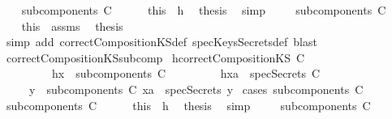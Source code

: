\begin{isabellebody}
\ \ \isamarkupfalse%
\ {\isachardoublequoteopen}subcomponents\ C\ {\isacharequal}\ {\isacharbraceleft}{\isacharbraceright}{\isachardoublequoteclose}\isanewline
\ \ \isamarkupfalse%
\ this\ \ h{}\ \isamarkupfalse%
\ {\isacharquery}thesis\ \isamarkupfalse%
\ simp\ \isanewline
{}\isamarkupfalse%
\isanewline
\ \ \isamarkupfalse%
\ {\isachardoublequoteopen}subcomponents\ C\ {\isasymnoteq}\ {\isacharbraceleft}{\isacharbraceright}{\isachardoublequoteclose}\isanewline
\ \ \isamarkupfalse%
\ this\ \ assms\ \isamarkupfalse%
\ {\isacharquery}thesis\ \isanewline
\ \ \isamarkupfalse%
\ {\isacharparenleft}simp\ add{\isacharcolon}\ correctCompositionKS{\isacharunderscore}def\ specKeysSecrets{\isacharunderscore}def{\isacharcomma}\ blast{\isacharparenright}\ \isanewline
{}\isamarkupfalse%
%
\endisatagproof
{\isafoldproof}%
%
\isadelimproof
\isanewline
%
\endisadelimproof
\isanewline
{}\isamarkupfalse%
\ correctCompositionKS{\isacharunderscore}subcomp{}{\isacharcolon}\isanewline
{}\ h{}{\isacharcolon}{\isachardoublequoteopen}correctCompositionKS\ C{\isachardoublequoteclose}\isanewline
\ \ \ \ \ \ \ \ \ h{}{\isacharcolon}{\isachardoublequoteopen}x\ {\isasymin}\ subcomponents\ C{\isachardoublequoteclose}\isanewline
\ \ \ \ \ \ \ \ \ h{}{\isacharcolon}{\isachardoublequoteopen}xa\ {\isasymin}\ specSecrets\ C{\isachardoublequoteclose}\isanewline
{}\ \ \ \ {\isachardoublequoteopen}{\isasymexists}\ y\ {\isasymin}\ subcomponents\ C{\isachardot}\ xa\ {\isasymin}\ specSecrets\ y{\isachardoublequoteclose}\isanewline
%
\isadelimproof
%
\endisadelimproof
%
\isatagproof
{}\isamarkupfalse%
\ {\isacharparenleft}cases\ {\isachardoublequoteopen}subcomponents\ C\ {\isacharequal}\ {\isacharbraceleft}{\isacharbraceright}{\isachardoublequoteclose}{\isacharparenright}\isanewline
\ \ \isamarkupfalse%
\ {\isachardoublequoteopen}subcomponents\ C\ {\isacharequal}\ {\isacharbraceleft}{\isacharbraceright}{\isachardoublequoteclose}\isanewline
\ \ \isamarkupfalse%
\ this\ \ h{}\ \isamarkupfalse%
\ {\isacharquery}thesis\ \isamarkupfalse%
\ simp\ \isanewline
{}\isamarkupfalse%
\isanewline
\ \ \isamarkupfalse%
\ {\isachardoublequoteopen}subcomponents\ C\ {\isasymnoteq}\ {\isacharbraceleft}{\isacharbraceright}{\isachardoublequoteclose}\isanewline

\end{isabellebody}

